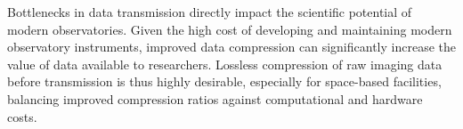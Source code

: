 %
Bottlenecks in data transmission directly impact the scientific potential of modern observatories. Given the high cost of developing and maintaining modern observatory instruments, improved data compression can significantly increase the value of data available to researchers. Lossless compression of raw imaging data before transmission is thus highly desirable, especially for space-based facilities, balancing improved compression ratios against computational and hardware costs.



